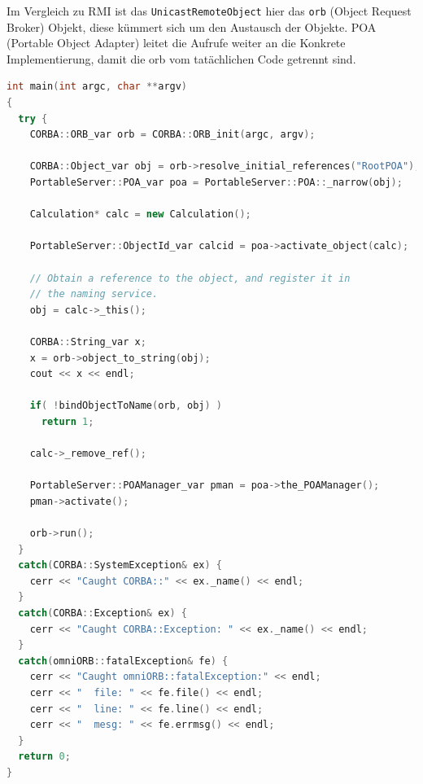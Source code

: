 Im Vergleich zu RMI ist das \texttt{UnicastRemoteObject} hier das \texttt{orb} (Object Request Broker) Objekt, diese k\"ummert sich um den Austausch der Objekte. POA (Portable Object Adapter) leitet die Aufrufe weiter an die Konkrete Implementierung, damit die orb vom tat\"achlichen Code getrennt sind.

\begin{lstlisting}[language=C++, caption=server.cc main Klasse welches die ORB und POA Objekte erstellt]
int main(int argc, char **argv)
{
  try {
    CORBA::ORB_var orb = CORBA::ORB_init(argc, argv);
    
    CORBA::Object_var obj = orb->resolve_initial_references("RootPOA");
    PortableServer::POA_var poa = PortableServer::POA::_narrow(obj);

    Calculation* calc = new Calculation();

    PortableServer::ObjectId_var calcid = poa->activate_object(calc);
    
    // Obtain a reference to the object, and register it in
    // the naming service.
    obj = calc->_this();

    CORBA::String_var x;
    x = orb->object_to_string(obj);
    cout << x << endl;

    if( !bindObjectToName(orb, obj) )
      return 1;

    calc->_remove_ref();
    
    PortableServer::POAManager_var pman = poa->the_POAManager();
    pman->activate();
    
    orb->run();
  }
  catch(CORBA::SystemException& ex) {
    cerr << "Caught CORBA::" << ex._name() << endl;
  }
  catch(CORBA::Exception& ex) {
    cerr << "Caught CORBA::Exception: " << ex._name() << endl;
  }
  catch(omniORB::fatalException& fe) {
    cerr << "Caught omniORB::fatalException:" << endl;
    cerr << "  file: " << fe.file() << endl;
    cerr << "  line: " << fe.line() << endl;
    cerr << "  mesg: " << fe.errmsg() << endl;
  }
  return 0;
}
\end{lstlisting}

\clearpage

